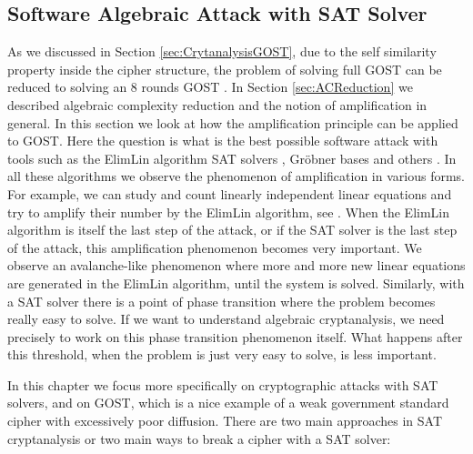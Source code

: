 \subsection{Software Algebraic Attack with SAT Solver} \label{sec:SoftAlgAttackSAT}
As we discussed in Section \ref{sec:CrytanalysisGOST}, due to the self similarity property inside the cipher structure, the problem of solving full GOST can be reduced to solving an 8 rounds GOST \cite{gostac}. In Section \ref{sec:ACReduction} we described algebraic complexity reduction and the notion of amplification in general. In this section we look at how the amplification principle can be applied to GOST. Here the question is what is the best possible software attack with tools such as the ElimLin algorithm \cite{AlgSnowCourtoisDebraize,DEScourtois,ElimLinR} SAT solvers \cite{OptimiPaper,BardCourtoiJeffersonConv}, Gr\"{o}bner bases \cite{grobner} and others \cite{SemaevSparseJournalPaper}. In all these algorithms we observe the phenomenon of amplification in various forms. For example, we can study and count linearly independent linear equations and try to amplify their number
by the ElimLin algorithm, see \cite{AlgSnowCourtoisDebraize,DEScourtois,ElimLinR}.
When the ElimLin algorithm is itself the last step of the attack, or if the SAT solver is the last step of the attack, this amplification phenomenon becomes very important. We observe an avalanche-like phenomenon where more and more new linear equations are generated in the ElimLin algorithm, until the system is solved. Similarly, with a SAT solver there is a point of phase transition
where the problem becomes really easy to solve. If we want to understand algebraic cryptanalysis, we need precisely to work
on this phase transition phenomenon itself. What happens after this threshold, when the problem is just very easy to solve,
is less important.

In this chapter we focus more specifically on cryptographic attacks with SAT solvers, and on GOST, which is a nice example
of a weak government standard cipher with excessively poor diffusion. There are two main approaches in SAT cryptanalysis
or two main ways to break a cipher with a SAT solver:

